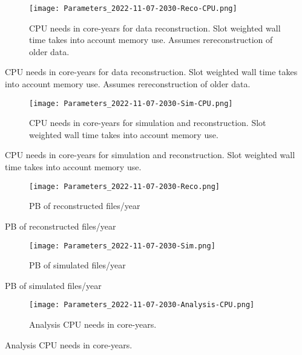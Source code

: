 \documentclass[12pt]{article}
\begin{document}
\begin{figure}[h]
\centering\texttt{[image: Parameters\_2022-11-07-2030-Reco-CPU.png]}\label{Reco-CPU}
\caption{CPU needs in core-years for data reconstruction.              Slot weighted wall time takes into account memory use.  Assumes rereconstruction of older data.}
\end{figure}
\begin{table}[h]
\centering{}\label{Reco-CPU
}
\caption{CPU needs in core-years for data reconstruction.              Slot weighted wall time takes into account memory use.  Assumes rereconstruction of older data.}
\end{table}
\begin{figure}[h]
\centering\texttt{[image: Parameters\_2022-11-07-2030-Sim-CPU.png]}\label{Sim-CPU}
\caption{CPU needs in core-years for simulation and reconstruction.              Slot weighted wall time takes into account memory use.}
\end{figure}
\begin{table}[h]
\centering{}\label{Sim-CPU
}
\caption{CPU needs in core-years for simulation and reconstruction.              Slot weighted wall time takes into account memory use.}
\end{table}
\begin{figure}[h]
\centering\texttt{[image: Parameters\_2022-11-07-2030-Reco.png]}\label{Reco}
\caption{PB of reconstructed files/year}
\end{figure}
\begin{table}[h]
\centering{}\label{Reco
}
\caption{PB of reconstructed files/year}
\end{table}
\begin{figure}[h]
\centering\texttt{[image: Parameters\_2022-11-07-2030-Sim.png]}\label{Sim}
\caption{PB of simulated files/year}
\end{figure}
\begin{table}[h]
\centering{}\label{Sim
}
\caption{PB of simulated files/year}
\end{table}
\begin{figure}[h]
\centering\texttt{[image: Parameters\_2022-11-07-2030-Analysis-CPU.png]}\label{Analysis-CPU}
\caption{Analysis CPU needs in core-years.}
\end{figure}
\begin{table}[h]
\centering{}\label{Analysis-CPU
}
\caption{Analysis CPU needs in core-years.}
\end{table}
\end{document}

